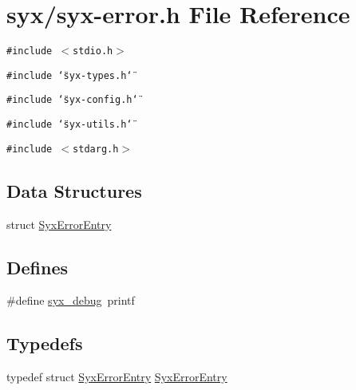\hypertarget{syx-error_8h}{
\section{syx/syx-error.h File Reference}
\label{syx-error_8h}
}
{\tt \#include $<$stdio.h$>$}\par
{\tt \#include \char`\"{}syx-types.h\char`\"{}}\par
{\tt \#include \char`\"{}syx-config.h\char`\"{}}\par
{\tt \#include \char`\"{}syx-utils.h\char`\"{}}\par
{\tt \#include $<$stdarg.h$>$}\par
\subsection*{Data Structures}
\begin{CompactItemize}
\item 
struct \hyperlink{struct_syx_error_entry}{SyxErrorEntry}
\end{CompactItemize}
\subsection*{Defines}
\begin{CompactItemize}
\item 
\#define \hyperlink{syx-error_8h_b1279ef115dd518ef5b63b51ae495fa5}{syx\_\-debug}~printf
\end{CompactItemize}
\subsection*{Typedefs}
\begin{CompactItemize}
\item 
typedef struct \hyperlink{struct_syx_error_entry}{SyxErrorEntry} \hyperlink{syx-error_8h_e71af3dc427617903fb6a6542c2fcc54}{SyxErrorEntry}
\end{CompactItemize}
